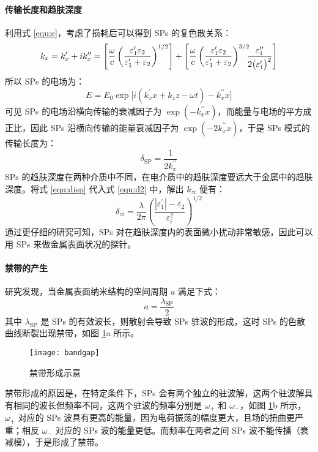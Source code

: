 \paragraph{传输长度和趋肤深度}
利用式 \ref{equ:e}，考虑了损耗后可以得到 SPs 的复色散关系：
\begin{equation}
\label{equ:cdisp}
k_x = k_x^{\prime}+ik_x^{\prime\prime}= \left[\dfrac{\omega}{c}\left(\dfrac{\varepsilon_1^{\prime}\varepsilon_2}{\varepsilon_1^{\prime}+\varepsilon_2}\right)^{1/2}\right]+\left[\dfrac{\omega}{c}\left(\dfrac{\varepsilon_1^{\prime}\varepsilon_2}{\varepsilon_1^{\prime}+\varepsilon_2}\right)^{3/2}\!\!\!\dfrac{\varepsilon_1^{\prime\prime}}{2\big(\varepsilon_1^{\prime}\big)^2}\right]
\end{equation}
所以 SPs 的电场为：
\[
	E = E_0\exp\big[i(k_x^{\prime}x+k_zz-\omega t)-k_x^{\prime\prime}x\big]
\]
可见 SPs 的电场沿横向传输的衰减因子为 $\exp(-k_x^{\prime\prime}x)$，而能量与电场的平方成正比，因此 SPs 沿横向传输的能量衰减因子为 $\exp(-2k_x^{\prime\prime}x)$，于是 SPs 模式的传输长度为：
\begin{equation}
\label{equ:l}
\delta_{\text{SP}} = \dfrac{1}{2k_x^{\prime\prime}}
\end{equation}
SPs 的趋肤深度在两种介质中不同，在电介质中的趋肤深度要远大于金属中的趋肤深度。将式 \ref{equ:disp} 代入式 \ref{equ:d2} 中，解出 $k_{zi}$ 便有：
\begin{equation}
\label{equ:z}
\delta_{zi} = \dfrac{\lambda}{2\pi}\left(\dfrac{|\varepsilon_1^{\prime}|-\varepsilon_2}{\varepsilon_i^2}\right)^{1/2}
\end{equation}
通过更仔细的研究可知，SPs 对在趋肤深度内的表面微小扰动非常敏感，因此可以用 SPs 来做金属表面状况的探针。

\paragraph{禁带的产生}
研究发现，当金属表面纳米结构的空间周期 $a$ 满足下式：
\[
	a = \dfrac{\lambda_{\text{SP}}}{2}
\]
其中 $\lambda_{\text{SP}}$ 是 SPs 的有效波长，则散射会导致 SPs 驻波的形成\cite{Barnes:2003aa}，这时 SPs 的色散曲线断裂出现禁带，如图 \ref{fig:bg}a 所示。

\begin{figure}[htbp]
\centering
\texttt{[image: bandgap]}
\caption{\label{fig:bg}禁带形成示意\cite{Barnes:2003aa}}
\end{figure}

禁带形成的原因是，在特定条件下，SPs 会有两个独立的驻波解，这两个驻波解具有相同的波长但频率不同，这两个驻波的频率分别是 $\omega_+$ 和 $\omega_-$，如图 \ref{fig:bg}b 所示，$\omega_+$ 对应的 SPs 波具有更高的能量，因为电荷振荡的幅度更大，且场的扭曲更严重；相反 $\omega_-$ 对应的 SPs 波的能量更低。而频率在两者之间 SPs 波不能传播（衰减模），于是形成了禁带。

